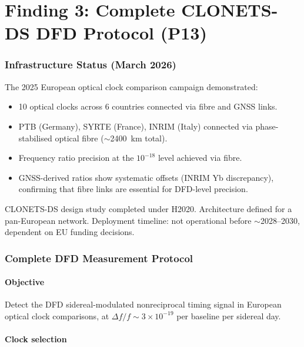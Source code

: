 \documentclass[11pt]{article}
\newcommand{\ee}[1]{\times 10^{#1}}
\begin{document}
\part{Finding 3: Complete CLONETS-DS DFD Protocol (P13)}
\label{part:P13}

\section{Infrastructure Status (March 2026)}

The 2025 European optical clock comparison campaign demonstrated:
\begin{itemize}[nosep]
\item 10 optical clocks across 6 countries connected via fibre and
  GNSS links.
\item PTB (Germany), SYRTE (France), INRIM (Italy) connected via
  phase-stabilised optical fibre ($\sim$2400~km total).
\item Frequency ratio precision at the $10^{-18}$ level achieved via
  fibre.
\item GNSS-derived ratios show systematic offsets (INRIM Yb discrepancy),
  confirming that fibre links are essential for DFD-level precision.
\end{itemize}

CLONETS-DS design study completed under H2020. Architecture defined
for a pan-European network. Deployment timeline: not operational
before $\sim$2028--2030, dependent on EU funding decisions.

\section{Complete DFD Measurement Protocol}

\subsection{Objective}

Detect the DFD sidereal-modulated nonreciprocal timing signal in
European optical clock comparisons, at $\Delta f/f \sim 3\ee{-19}$
per baseline per sidereal day.

\subsection{Clock selection}
\end{document}
